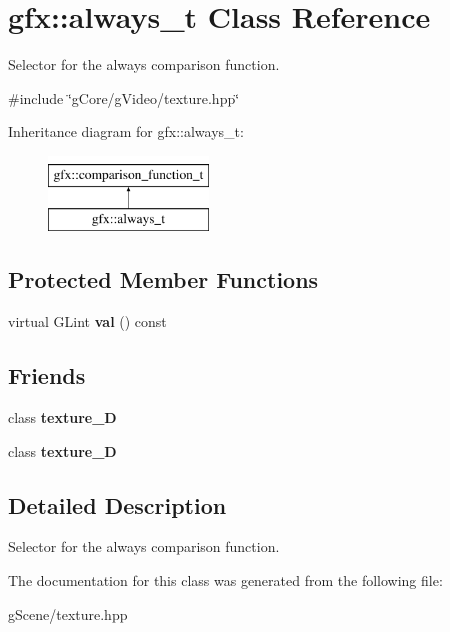 \hypertarget{classgfx_1_1always__t}{\section{gfx\-:\-:always\-\_\-t Class Reference}
\label{classgfx_1_1always__t}
}


Selector for the always comparison function.  




{\ttfamily \#include \char`\"{}g\-Core/g\-Video/texture.\-hpp\char`\"{}}

Inheritance diagram for gfx\-:\-:always\-\_\-t\-:\begin{figure}[H]
\begin{center}
\leavevmode
\includegraphics[height=2.000000cm]{classgfx_1_1always__t}
\end{center}
\end{figure}
\subsection*{Protected Member Functions}
\begin{DoxyCompactItemize}
\item 
\hypertarget{classgfx_1_1always__t_a9946abfae3f332483680676d6a5379bf}{virtual G\-Lint {\bfseries val} () const }\label{classgfx_1_1always__t_a9946abfae3f332483680676d6a5379bf}

\end{DoxyCompactItemize}
\subsection*{Friends}
\begin{DoxyCompactItemize}
\item 
\hypertarget{classgfx_1_1always__t_a2039d67f6166ccf823c78e3476aad9aa}{class {\bfseries texture\-\_\-D}}\label{classgfx_1_1always__t_a2039d67f6166ccf823c78e3476aad9aa}

\item 
\hypertarget{classgfx_1_1always__t_a22ad86ef46c3b17357a0cd59e50bc7dd}{class {\bfseries texture\-\_\-D}}\label{classgfx_1_1always__t_a22ad86ef46c3b17357a0cd59e50bc7dd}

\end{DoxyCompactItemize}


\subsection{Detailed Description}
Selector for the always comparison function. 

The documentation for this class was generated from the following file\-:\begin{DoxyCompactItemize}
\item 
g\-Scene/texture.\-hpp\end{DoxyCompactItemize}
